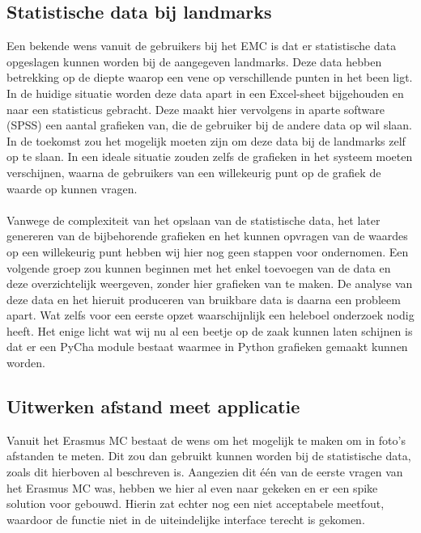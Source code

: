 \subsection{Statistische data bij landmarks} %
Een bekende wens vanuit de gebruikers bij het EMC is dat er statistische data opgeslagen kunnen worden bij de aangegeven landmarks.
Deze data hebben betrekking op de diepte waarop een vene op verschillende punten in het been ligt.
In de huidige situatie worden deze data apart in een Excel-sheet bijgehouden en naar een statisticus gebracht.
Deze maakt hier vervolgens in aparte software (SPSS)\cite{spss} een aantal grafieken van, die de gebruiker bij de andere data op wil slaan.
In de toekomst zou het mogelijk moeten zijn om deze data bij de landmarks zelf op te slaan.
In een ideale situatie zouden zelfs de grafieken in het systeem moeten verschijnen, waarna de gebruikers van een willekeurig punt op de grafiek de waarde op kunnen vragen.
\\
\\
Vanwege de complexiteit van het opslaan van de statistische data, het later genereren van de bijbehorende grafieken en het kunnen opvragen van de waardes op een willekeurig punt hebben wij hier nog geen stappen voor ondernomen.
Een volgende groep zou kunnen beginnen met het enkel toevoegen van de data en deze overzichtelijk weergeven, zonder hier grafieken van te maken.
De analyse van deze data en het hieruit produceren van bruikbare data is daarna een probleem apart.
Wat zelfs voor een eerste opzet waarschijnlijk een heleboel onderzoek nodig heeft.
Het enige licht wat wij nu al een beetje op de zaak kunnen laten schijnen is dat er een PyCha module bestaat waarmee in Python grafieken gemaakt kunnen worden.

\subsection{Uitwerken afstand meet applicatie} %
\label{customjaap}
Vanuit het Erasmus MC bestaat de wens om het mogelijk te maken om in foto's afstanden te meten.
Dit zou dan gebruikt kunnen worden bij de statistische data, zoals dit hierboven al beschreven is.
Aangezien dit \'{e}\'{e}n van de eerste vragen van het Erasmus MC was, hebben we hier al even naar gekeken en er een spike solution voor gebouwd.
Hierin zat echter nog een niet acceptabele meetfout, waardoor de functie niet in de uiteindelijke interface terecht is gekomen.

